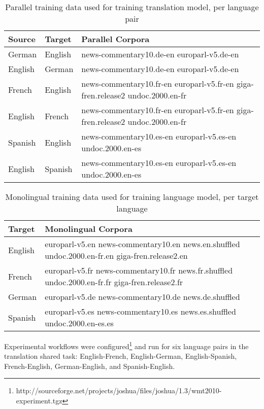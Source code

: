 \documentclass[11pt]{article}
\begin{document}
\begin{table*}[htb]
\begin{center}
\begin{tabular}{|l|l|l|}
\hline
\bf Source & \bf Target & \bf Parallel Corpora \\ \hline
German & English & news-commentary10.de-en europarl-v5.de-en \\ \hline
English & German & news-commentary10.de-en europarl-v5.de-en \\ \hline
French & English & news-commentary10.fr-en europarl-v5.fr-en giga-fren.release2 undoc.2000.en-fr \\ \hline
English & French & news-commentary10.fr-en europarl-v5.fr-en giga-fren.release2 undoc.2000.en-fr \\ \hline
Spanish & English & news-commentary10.es-en europarl-v5.es-en undoc.2000.en-es \\ \hline
English & Spanish & news-commentary10.es-en europarl-v5.es-en undoc.2000.en-es  \\ \hline
\end{tabular}
\end{center}
\caption{Parallel training data used for training translation model, per language pair}
\label{parallelCorpora}
\end{table*}

\begin{table*}[htb]
\begin{center}
\begin{tabular}{|l|l|}
\hline
\bf Target & \bf Monolingual Corpora \\ \hline
English & europarl-v5.en news-commentary10.en news.en.shuffled undoc.2000.en-fr.en giga-fren.release2.en \\ \hline
French & europarl-v5.fr news-commentary10.fr news.fr.shuffled undoc.2000.en-fr.fr giga-fren.release2.fr \\ \hline
German & europarl-v5.de news-commentary10.de news.de.shuffled \\ \hline
Spanish & europarl-v5.es news-commentary10.es news.es.shuffled undoc.2000.en-es.es\\ \hline
\end{tabular}
\end{center}
\caption{Monolingual training data used for training language model, per target language}
\label{monolingualCorpora}
\end{table*}


Experimental workflows were configured\footnote{http://sourceforge.net/projects/joshua/files/joshua/1.3/wmt2010-experiment.tgz} and run for six language pairs in the translation shared task: English-French, English-German, English-Spanish, French-English, German-English, and Spanish-English. 
\end{document}
